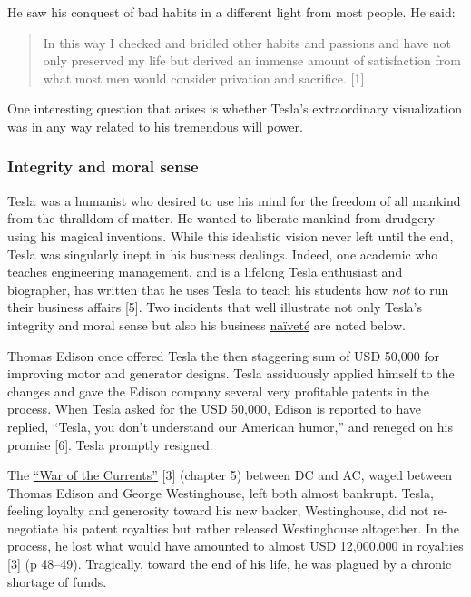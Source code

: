 \documentclass[
  11pt,
  a4paper,
]{article}
\begin{document}
He saw his conquest of bad habits in a different light from most people.
He said:

\begin{quote}
In this way I checked and bridled other habits and passions and have not
only preserved my life but derived an immense amount of satisfaction
from what most men would consider privation and sacrifice. {[}1{]}
\end{quote}

One interesting question that arises is whether Tesla's extraordinary
visualization was in any way related to his tremendous will power.

\hypertarget{integrity-and-moral-sense}{%
\subsubsection{Integrity and moral
sense}\label{integrity-and-moral-sense}}

Tesla was a humanist who desired to use his mind for the freedom of all
mankind from the thralldom of matter. He wanted to liberate mankind from
drudgery using his magical inventions. While this idealistic vision
never left until the end, Tesla was singularly inept in his business
dealings. Indeed, one academic who teaches engineering management, and
is a lifelong Tesla enthusiast and biographer, has written that he uses
Tesla to teach his students how \emph{not} to run their business affairs
{[}5{]}. Two incidents that well illustrate not only Tesla's integrity
and moral sense but also his business
\href{https://www.thefreedictionary.com/naivete}{naïveté} are noted
below.

Thomas Edison once offered Tesla the then staggering sum of USD 50,000
for improving motor and generator designs. Tesla assiduously applied
himself to the changes and gave the Edison company several very
profitable patents in the process. When Tesla asked for the USD 50,000,
Edison is reported to have replied, ``Tesla, you don't understand our
American humor,'' and reneged on his promise {[}6{]}. Tesla promptly
resigned.

The \href{https://en.wikipedia.org/wiki/War_of_the_currents}{``War of
the Currents''} {[}3{]} (chapter 5) between DC and AC, waged between
Thomas Edison and George Westinghouse, left both almost bankrupt. Tesla,
feeling loyalty and generosity toward his new backer, Westinghouse, did
not re-negotiate his patent royalties but rather released Westinghouse
altogether. In the process, he lost what would have amounted to almost
USD 12,000,000 in royalties {[}3{]} (p 48--49). Tragically, toward the
end of his life, he was plagued by a chronic shortage of funds.
\end{document}

